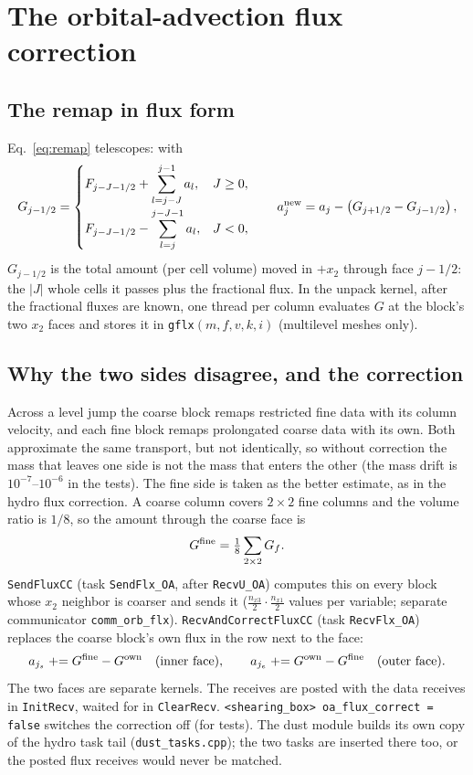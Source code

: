 \documentclass[11pt]{article}
\newcommand{\code}[1]{\texttt{#1}}
\newcommand{\file}[1]{\texttt{\small #1}}
\newcommand{\fn}[1]{\texttt{\small #1}}
\begin{document}
\section{The orbital-advection flux correction}
\label{sec:fluxcorr}

\subsection{The remap in flux form}
Eq.~\eqref{eq:remap} telescopes: with
\begin{equation}
  G_{j-1/2} = \begin{cases}
     \displaystyle F_{j-J-1/2} + \sum_{l=j-J}^{j-1} a_l, & J \ge 0,\\[1.2em]
     \displaystyle F_{j-J-1/2} - \sum_{l=j}^{j-J-1} a_l, & J < 0,
  \end{cases}
  \qquad
  a^{\rm new}_j = a_j - \left(G_{j+1/2} - G_{j-1/2}\right),
  \label{eq:G}
\end{equation}
$G_{j-1/2}$ is the total amount (per cell volume) moved in $+x_2$ through face
$j - 1/2$: the $|J|$ whole cells it passes plus the fractional flux. In the unpack kernel,
after the fractional fluxes are known, one thread per column evaluates $G$ at the block's
two $x_2$ faces and stores it in \code{gflx}$(m, f, v, k, i)$ (multilevel meshes only).

\subsection{Why the two sides disagree, and the correction}
Across a level jump the coarse block remaps restricted fine data with its column
velocity, and each fine block remaps prolongated coarse data with its own. Both
approximate the same transport, but not identically, so without correction the mass
that leaves one side is not the mass that enters the other (the mass drift is
$10^{-7}$--$10^{-6}$ in the tests). The fine side is taken as the better estimate, as in
the hydro flux correction. A coarse column covers $2\times2$ fine columns and the volume
ratio is $1/8$, so the amount through the coarse face is
\begin{equation}
  G^{\rm fine} = \tfrac18 \sum_{2\times2} G_f .
\end{equation}
\fn{SendFluxCC} (task \fn{SendFlx\_OA}, after \fn{RecvU\_OA}) computes this on every
block whose $x_2$ neighbor is coarser and sends it ($\tfrac{n_{x3}}2\cdot\tfrac{n_{x1}}2$
values per variable; separate communicator \code{comm\_orb\_flx}).
\fn{RecvAndCorrectFluxCC} (task \fn{RecvFlx\_OA}) replaces the coarse block's own flux
in the row next to the face:
\begin{equation}
  a_{j_s} \mathrel{+}= G^{\rm fine} - G^{\rm own} \quad\text{(inner face)}, \qquad
  a_{j_e} \mathrel{+}= G^{\rm own} - G^{\rm fine} \quad\text{(outer face)}.
\end{equation}
The two faces are separate kernels. The receives are posted with the data receives in
\fn{InitRecv}, waited for in \fn{ClearRecv}. \code{<shearing\_box> oa\_flux\_correct =
false} switches the correction off (for tests). The dust module builds its own copy of
the hydro task tail (\file{dust\_tasks.cpp}); the two tasks are inserted there too, or
the posted flux receives would never be matched.
\end{document}
